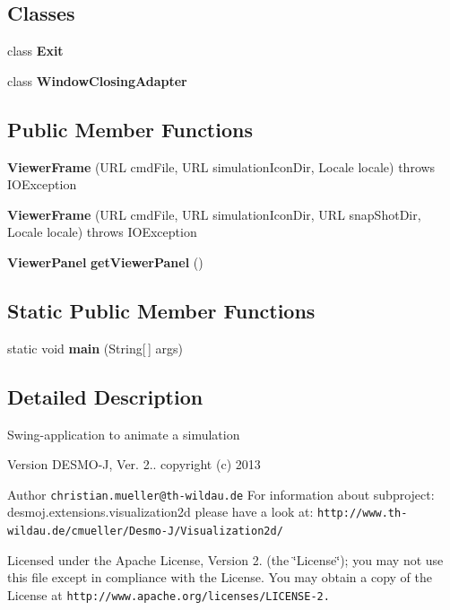\subsection*{Classes}
\begin{DoxyCompactItemize}
\item 
class {\bfseries Exit}
\item 
class {\bfseries Window\-Closing\-Adapter}
\end{DoxyCompactItemize}
\subsection*{Public Member Functions}
\begin{DoxyCompactItemize}
\item 
{\bf Viewer\-Frame} (U\-R\-L cmd\-File, U\-R\-L simulation\-Icon\-Dir, Locale locale)  throws I\-O\-Exception
\item 
{\bf Viewer\-Frame} (U\-R\-L cmd\-File, U\-R\-L simulation\-Icon\-Dir, U\-R\-L snap\-Shot\-Dir, Locale locale)  throws I\-O\-Exception
\item 
{\bf Viewer\-Panel} {\bfseries get\-Viewer\-Panel} ()\label{classdesmoj_1_1extensions_1_1visualization2d_1_1engine_1_1viewer_1_1_viewer_frame_a71a5c7a5363fad1d301bbb83f36d0a3a}

\end{DoxyCompactItemize}
\subsection*{Static Public Member Functions}
\begin{DoxyCompactItemize}
\item 
static void {\bf main} (String[$\,$] args)
\end{DoxyCompactItemize}


\subsection{Detailed Description}
Swing-\/application to animate a simulation

\begin{DoxyVersion}{Version}
D\-E\-S\-M\-O-\/\-J, Ver. 2.. copyright (c) 2013 
\end{DoxyVersion}
\begin{DoxyAuthor}{Author}
{\tt christian.\-mueller@th-\/wildau.\-de} For information about subproject\-: desmoj.\-extensions.\-visualization2d please have a look at\-: {\tt http\-://www.\-th-\/wildau.\-de/cmueller/\-Desmo-\/\-J/\-Visualization2d/}
\end{DoxyAuthor}
Licensed under the Apache License, Version 2. (the \char`\"{}\-License\char`\"{}); you may not use this file except in compliance with the License. You may obtain a copy of the License at {\tt http\-://www.\-apache.\-org/licenses/\-L\-I\-C\-E\-N\-S\-E-\/2.}


